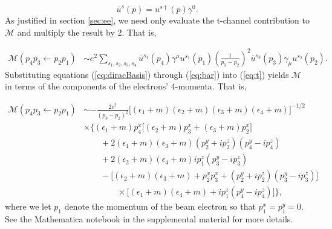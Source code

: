 \documentclass{article}
\begin{document}
\begin{equation}
  \bar{u}^s(p) = u^{s\dag}(p)\gamma^0.
  \label{eq:bar}
\end{equation}
%
As justified in section \ref{sec:ee}, we need only evaluate the t-channel
contribution to $\mathcal{M}$ and multiply the result by 2.  That is, 

\begin{equation} 
  \label{eq:t} 
  \begin{aligned} 
    \mathcal{M}(p_4p_3\leftarrow
    p_2p_1) 
    &\sim
    e^2 \sum_{s_1,s_2,s_3, s_4}
      \bar{u}^{s_4}\left(p_4\right)\gamma^{\mu}u^{s_1}\left(p_1\right)
      \left(\frac{1}{p_3 - p_2}\right)^2
      \bar{u}^{s_3}\left(p_3\right)\gamma_{\mu}u^{s_2}\left(p_2\right).
  \end{aligned} 
\end{equation}
%
Substituting equations (\ref{eq:diracBasis}) through (\ref{eq:bar}) into
(\ref{eq:t}) yields $\mathcal{M}$ in terms of the components of the electrons'
4-momenta.  That is,

\begin{equation}
\begin{aligned}
\mathcal{M}(p_4p_3\leftarrow p_2p_1)
&\sim
-\frac{2e^2}{(p_3 - p_2)^2}
\big[(\epsilon_1 + m)(\epsilon_2 + m)(\epsilon_3 + m)(\epsilon_4 + m)\big]^{-1/2}
\\&\times\Big\{
  (\epsilon_1 + m)p_4^x\big[(\epsilon_2 + m)p_3^x
    + (\epsilon_3 + m)p_2^x\big]
  \\&\qquad+
  2(\epsilon_1 + m)(\epsilon_3 + m)(p_2^y + ip_2^z)(p_4^y - ip_4^z)
  \\&\qquad+
  2(\epsilon_2 + m)(\epsilon_4 + m)ip_1^z(p_3^y - ip_3^z)
  \\&\qquad-
  \big[(\epsilon_2 + m)(\epsilon_3 + m) + p_2^xp_3^x
      + (p_2^y + ip_2^z)(p_3^y - ip_3^z)\big]
  \\&\qquad\qquad\times
  \big[(\epsilon_1 + m)(\epsilon_4 + m) + ip_1^z(p_4^y - ip_4^z)\big]
\Big\},
\end{aligned}
\end{equation}
%
where we let $p_1$ denote the momentum of the beam electron so that $p_1^x =
p_1^y = 0$.
See the Mathematica \cite{Mathematica} notebook in the supplemental material
for more details.

\pagebreak
\end{document}
